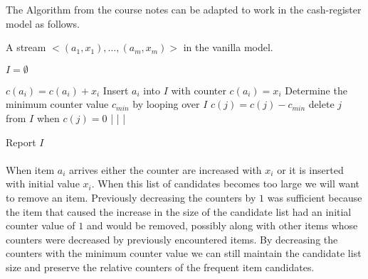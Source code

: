 The Algorithm from the course notes can be adapted to work in the cash-register model as follows.

\begin{minipage}[t]{\textwidth}
\begin{sourcecode}
A stream $<(a_1, x_1), \ldots , (a_m, x_m)>$ in the vanilla model.
\silend

$I = \emptyset$
\silend

	$c(a_i) = c(a_i) + x_i$
\qelse
	Insert $a_i$ into $I$ with counter $c(a_i) = x_i$
		Determine the minimum counter value $c_{\textit{min}}$ by looping over $I$
			$c(j) = c(j) - c_{\textit{min}}$
			delete $j$ from $I$ when $c(j) = 0$ 
		|
	|			
|
\silend

Report $I$
\qend
\end{sourcecode}
\end{minipage}

\paragraph{} When item $a_i$ arrives either the counter are increased with $x_i$ or it is inserted with initial value $x_i$. When this list of candidates becomes too large we will want to remove an item. Previously decreasing the counters by $1$ was sufficient because the item that caused the increase in the size of the candidate list had an initial counter value of $1$ and would be removed, possibly along with other items whose counters were decreased by previously encountered items. By decreasing the counters with the minimum counter value we can still maintain the candidate list size and preserve the relative counters of the frequent item candidates.
